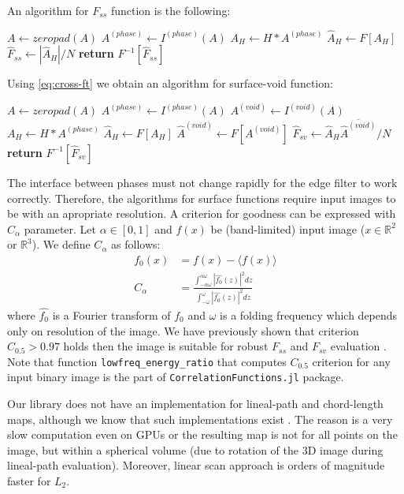 \documentclass[1p]{elsarticle}
\newcommand{\code}[1]{\colorbox{light-gray}{\texttt{#1}}}
\begin{document}
An algorithm for $F_{ss}$ function is the following:
\begin{algorithmic}[1]
    \State $A \gets zeropad(A)$
  \EndIf
  \State $A^{(phase)} \gets I^{(phase)} (A)$
  \State $A_H \gets H * A^{(phase)}$
  \State $\hat{A}_H \gets F[A_H]$
  \State $\hat{F}_{ss} \gets |\hat{A}_H| / N$
  \State \textbf{return} $F^{-1} [\hat{F}_{ss}]$
  \EndProcedure
\end{algorithmic}

Using \cref{eq:cross-ft} we obtain an algorithm for surface-void function:
\begin{algorithmic}[1]
    \State $A \gets zeropad(A)$
  \EndIf
  \State $A^{(phase)} \gets I^{(phase)} (A)$
  \State $A^{(void)} \gets I^{(void)} (A)$
  \State $A_H \gets H * A^{(phase)}$
  \State $\hat{A}_H \gets F[A_H]$
  \State $\hat{A}^{(void)} \gets F[A^{(void)}]$
  \State $\hat{F}_{sv} \gets \hat{A}_H \overline{\hat{A}^{(void)}} / N$
  \State \textbf{return} $F^{-1} [\hat{F}_{sv}]$
  \EndProcedure
\end{algorithmic}

The interface between phases must not change rapidly for the edge filter to
work correctly. Therefore, the algorithms for surface functions require input
images to be with an apropriate resolution. A criterion for goodness can be expressed with
$C_{\alpha}$ parameter. Let $\alpha \in [0, 1]$ and $f(x)$ be
(band-limited) input image ($x \in \mathbb{R}^2$ or $\mathbb{R}^3$). We define
$C_\alpha$ as follows:
\begin{align*}
  f_0(x) &= f(x) - \langle f(x) \rangle \\
  C_\alpha &= \frac{\int_{-\alpha\omega}^{\alpha\omega} |\hat{f_0}(z)|^2
    dz}{\int_{-\omega}^{\omega} |\hat{f_0}(z)|^2 dz}
\end{align*}
where $\hat{f_0}$ is a Fourier transform of $f_0$ and $\omega$ is a folding
frequency which depends only on resolution of the image. We have previously
shown that criterion $C_{0.5} > 0.97$ holds then the image is suitable for
robust $F_{ss}$ and $F_{sv}$ evaluation \cite{samarin2023robust}.  Note that
function \code{lowfreq\_energy\_ratio} that computes $C_{0.5}$ criterion for any
input binary image is the part of \code{CorrelationFunctions.jl} package.

Our library does not have an implementation for lineal-path and chord-length
maps, although we know that such implementations exist
\cite{turner2016efficient,Havelka}. The reason is a very slow computation even
on GPUs or the resulting map is not for all points on the image, but within a
spherical volume (due to rotation of the 3D image during lineal-path
evaluation). Moreover, linear scan approach is orders of magnitude faster for
$L_2$.
\end{document}
